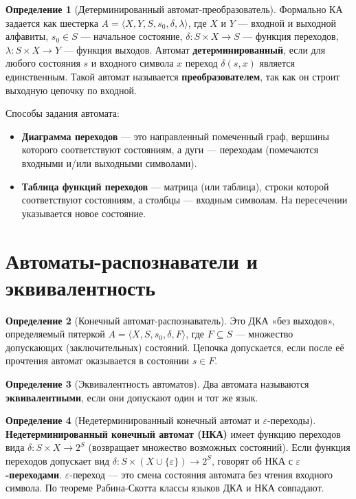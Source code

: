 \documentclass[12pt,a4paper]{article}
\theoremstyle{definition}
\newtheorem{definition}{Определение}
\theoremstyle{plain}
\theoremstyle{remark}
\begin{document}
\begin{definition}[Детерминированный автомат-преобразователь]
Формально КА задается как шестерка $A = \langle X, Y, S, s_0, \delta, \lambda \rangle$, где $X$ и $Y$ — входной и выходной алфавиты, $s_0 \in S$ — начальное состояние, $\delta: S \times X \to S$ — функция переходов, $\lambda: S \times X \to Y$ — функция выходов.
Автомат \textbf{детерминированный}, если для любого состояния $s$ и входного символа $x$ переход $\delta(s, x)$ является единственным.
Такой автомат называется \textbf{преобразователем}, так как он строит выходную цепочку по входной.
\end{definition}

Способы задания автомата:
\begin{itemize}
    \item \textbf{Диаграмма переходов} — это направленный помеченный граф, вершины которого соответствуют состояниям, а дуги — переходам (помечаются входными и/или выходными символами).
    \item \textbf{Таблица функций переходов} — матрица (или таблица), строки которой соответствуют состояниям, а столбцы — входным символам. На пересечении указывается новое состояние.
\end{itemize}

\section{Автоматы-распознаватели и эквивалентность}

\begin{definition}[Конечный автомат-распознаватель]
Это ДКА «без выходов», определяемый пятеркой $A = \langle X, S, s_0, \delta, F \rangle$, где $F \subseteq S$ — множество допускающих (заключительных) состояний. Цепочка допускается, если после её прочтения автомат оказывается в состоянии $s \in F$.
\end{definition}

\begin{definition}[Эквивалентность автоматов]
Два автомата называются \textbf{эквивалентными}, если они допускают один и тот же язык.
\end{definition}

\begin{definition}[Недетерминированный конечный автомат и $\varepsilon$-переходы]
\textbf{Недетерминированный конечный автомат (НКА)} имеет функцию переходов вида $\delta: S \times X \to 2^S$ (возвращает множество возможных состояний).
Если функция переходов допускает вид $\delta: S \times (X \cup \{\varepsilon\}) \to 2^S$, говорят об НКА с \textbf{$\varepsilon$-переходами}. $\varepsilon$-переход — это смена состояния автомата без чтения входного символа. По теореме Рабина-Скотта классы языков ДКА и НКА совпадают.
\end{definition}
\end{document}
